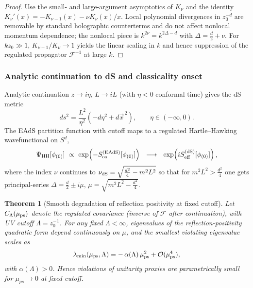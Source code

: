 \documentclass[10pt]{article}
\theoremstyle{definition}
\theoremstyle{plain}
\newtheorem{theorem}{Theorem}[section]
\begin{document}
\begin{proof}
Use the small- and large-argument asymptotics of $K_\nu$ and the identity $K_\nu'(x)=-K_{\nu-1}(x)-\nu K_\nu(x)/x$. Local polynomial divergences in $z_0^{-d}$ are removable by standard holographic counterterms and do not affect nonlocal momentum dependence; the nonlocal piece is $k^{2\nu}=k^{2\Delta-d}$ with $\Delta=\frac{d}{2}+\nu$. For $kz_0\gg 1$, $K_{\nu-1}/K_\nu\to 1$ yields the linear scaling in $k$ and hence suppression of the regulated propagator $\mathcal{F}^{-1}$ at large $k$.
\end{proof}

\subsubsection*{Analytic continuation to dS and classicality onset}
\label{subsec:analytic-continuation}

Analytic continuation $z\to i\eta$, $L\to iL$ (with $\eta<0$ conformal time) gives the dS metric
\begin{equation}
ds^2 = \frac{L^2}{\eta^2}\left(-d\eta^2 + d\vec{x}^{\,2}\right),\qquad \eta\in(-\infty,0).
\end{equation}
The EAdS partition function with cutoff maps to a regulated Hartle--Hawking wavefunctional \cite{HartleHawking1983} on $S^d$,
\begin{equation}
\Psi_{\rm HH}[\phi_{(0)}]\ \propto\ \exp\!\left(-S_{\rm os}^{\rm (EAdS)}[\phi_{(0)}]\right)
\ \ \longrightarrow\ \
\exp\!\left(i S_{\rm eff}^{\rm (dS)}[\phi_{(0)}]\right),
\end{equation}
where the index $\nu$ continues to $\nu_{\rm dS}=\sqrt{\frac{d^2}{4}-m^2L^2}$ so that for $m^2L^2>\frac{d^2}{4}$ one gets principal-series $\Delta=\frac{d}{2}\pm i\mu$, $\mu=\sqrt{m^2L^2-\frac{d^2}{4}}$.

\begin{theorem}[Smooth degradation of reflection positivity at fixed cutoff]
\label{thm:smoothRP}
Let $C_\Lambda(\mu_{\rm ps})$ denote the regulated covariance (inverse of $\mathcal{F}$ after continuation), with UV cutoff $\Lambda=z_0^{-1}$. For any fixed $\Lambda<\infty$, eigenvalues of the reflection-positivity quadratic form depend continuously on $\mu$, and the smallest violating eigenvalue scales as
\begin{equation}
\lambda_{\min}(\mu_{\rm ps},\Lambda) = -\,\alpha(\Lambda)\,\mu_{\rm ps}^2 + \mathcal{O}(\mu_{\rm ps}^4),
\end{equation}
with $\alpha(\Lambda)>0$. Hence violations of unitarity proxies are parametrically small for $\mu_{ps}\to 0$ at fixed cutoff.
\end{theorem}
\end{document}
